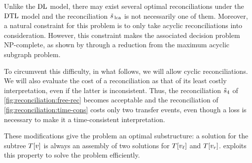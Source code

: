 Unlike the \(\mathrm{D}\mathrm{L}\) model, there may exist several optimal reconciliations under the \(\mathrm{D}\mathrm{T}\mathrm{L}\) model and the reconciliation \(\tilde{s}_{\,\mathrm{lca}}\) is not necessarily one of them.
Moreover, a natural constraint for this problem is to only take acyclic reconciliations into consideration.
However, this constraint makes the associated decision problem NP-complete, as shown by \textcite{Tofigh2011SimultaneousIdentificationDuplications} through a reduction from the maximum acyclic subgraph problem.

To circumvent this difficulty, in what follows, we will allow cyclic reconciliations.
We will also evaluate the cost of a reconciliation as that of its least costly interpretation, even if the latter is inconsistent.
Thus, the reconciliation \(\tilde{s}_4\) of \cref{fig:reconciliation:free-rec} becomes acceptable and the reconciliation of \cref{fig:reconciliation:time-cons} costs only two transfer events, even though a loss is necessary to make it a time-consistent interpretation.

These modifications give the problem an optimal substructure: a solution for the subtree \(T[v]\) is always an assembly of two solutions for \(T[v_\mathit{\ell}]\) and \(T[v_r]\).
 exploits this property to solve the problem efficiently.

\newcommand{\fndtl}{\mathrm{cost}}
\newcommand{\varspe}{\mathrm{Spe_{LR}}}
\newcommand{\varsperl}{\mathrm{Spe_{RL}}}
\newcommand{\vardup}{\mathrm{Dup}}
\newcommand{\varhgt}{\mathrm{Tra_L}}
\newcommand{\varhgtr}{\mathrm{Tra_R}}
\newcommand{\varhgtlr}{\mathrm{Tra_{LR}}}

